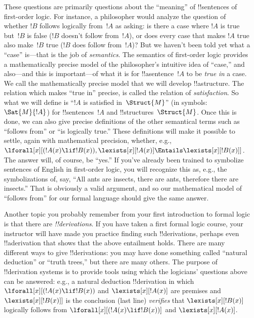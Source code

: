 These questions are primarily questions about the ``meaning'' of
!!{sentence}s of first-order logic.  For instance, a philosopher would
analyze the question of whether $!B$ follows logically from~$!A$ as
asking: is there a case where $!A$ is true but~$!B$ is false ($!B$
doesn't follow from~$!A$), or does every case that makes $!A$ true
also make~$!B$ true ($!B$ does follow from~$!A$)?  But we haven't been
told yet what a ``case'' is---that is the job of \emph{semantics}.  The
semantics of first-order logic provides a mathematically precise model
of the philosopher's intuitive idea of ``case,'' and also---and this
is important---of what it is for !!a{sentence}~$!A$ to be \emph{true
in} a case. We call the mathematically precise model that we will
develop !!a{structure}. The relation which makes ``true in'' precise,
is called the relation of \emph{satisfaction}.  So what we will define
is ``$!A$ is satisfied in~$\Struct{M}$'' (in symbols: $\Sat{M}{!A}$)
for !!{sentence}s~$!A$ and !!{structure}s~$\Struct{M}$. Once this is
done, we can also give precise definitions of the other semantical
terms such as ``follows from'' or ``is logically true.'' These
definitions will make it possible to settle, again with mathematical
precision, whether, e.g., $\lforall[x][(!A(x) \lif !B(x)),
\lexists[x][!A(x)] \Entails \lexists[x][!B(x)]]$. The answer will, of
course, be ``yes.'' If you've already been trained to symbolize
sentences of English in first-order logic, you will recognize this as,
e.g., the symbolizations of, say, ``All ants are insects, there are
ants, therefore there are insects.'' That is obviously a valid
argument, and so our mathematical model of ``follows from'' for our
formal language should give the same answer.

Another topic you probably remember from your first introduction to
formal logic is that there are \emph{!!{derivation}s}.  If you have
taken a first formal logic course, your instructor will have made you
practice finding such !!{derivation}s, perhaps even !!a{derivation}
that shows that the above entailment holds.  There are many different
ways to give !!{derivation}s: you may have done something called
``natural deduction'' or ``truth trees,'' but there are many others.
The purpose of !!{derivation} systems is to provide tools using which the
logicians' questions above can be answered: e.g., a natural deduction
!!{derivation} in which $\lforall[x][(!A(x) \lif !B(x))$ and
$\lexists[x][!A(x)]$ are premises and $\lexists[x][!B(x)]]$ is the
conclusion (last line) \emph{verifies} that $\lexists[x][!B(x)]$
logically follows from $\lforall[x][(!A(x) \lif !B(x))]$ and
$\lexists[x][!A(x)]$.  

